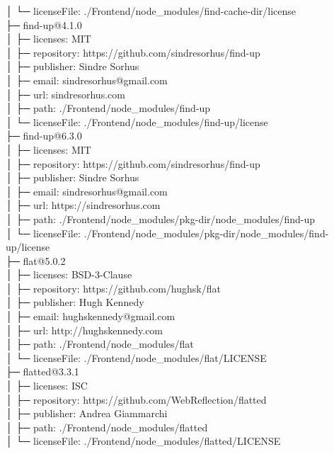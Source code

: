 \documentclass[
    paper=a4,
    twoside=false,
    parskip=half,
    listof=entryprefix,
    listof=totoc,
    index=totoc,
    bibliography=totoc,
    headsepline,
]{scrbook}
\begin{document}
    │  └─ licenseFile: ./Frontend/node\_modules/find-cache-dir/license\\
    ├─ find-up@4.1.0\\
    │  ├─ licenses: MIT\\
    │  ├─ repository: https://github.com/sindresorhus/find-up\\
    │  ├─ publisher: Sindre Sorhus\\
    │  ├─ email: sindresorhus@gmail.com\\
    │  ├─ url: sindresorhus.com\\
    │  ├─ path: ./Frontend/node\_modules/find-up\\
    │  └─ licenseFile: ./Frontend/node\_modules/find-up/license\\
    ├─ find-up@6.3.0\\
    │  ├─ licenses: MIT\\
    │  ├─ repository: https://github.com/sindresorhus/find-up\\
    │  ├─ publisher: Sindre Sorhus\\
    │  ├─ email: sindresorhus@gmail.com\\
    │  ├─ url: https://sindresorhus.com\\
    │  ├─ path: ./Frontend/node\_modules/pkg-dir/node\_modules/find-up\\
    │  └─ licenseFile: ./Frontend/node\_modules/pkg-dir/node\_modules/find-up/license\\
    ├─ flat@5.0.2\\
    │  ├─ licenses: BSD-3-Clause\\
    │  ├─ repository: https://github.com/hughsk/flat\\
    │  ├─ publisher: Hugh Kennedy\\
    │  ├─ email: hughskennedy@gmail.com\\
    │  ├─ url: http://hughskennedy.com\\
    │  ├─ path: ./Frontend/node\_modules/flat\\
    │  └─ licenseFile: ./Frontend/node\_modules/flat/LICENSE\\
    ├─ flatted@3.3.1\\
    │  ├─ licenses: ISC\\
    │  ├─ repository: https://github.com/WebReflection/flatted\\
    │  ├─ publisher: Andrea Giammarchi\\
    │  ├─ path: ./Frontend/node\_modules/flatted\\
    │  └─ licenseFile: ./Frontend/node\_modules/flatted/LICENSE\\
\end{document}
